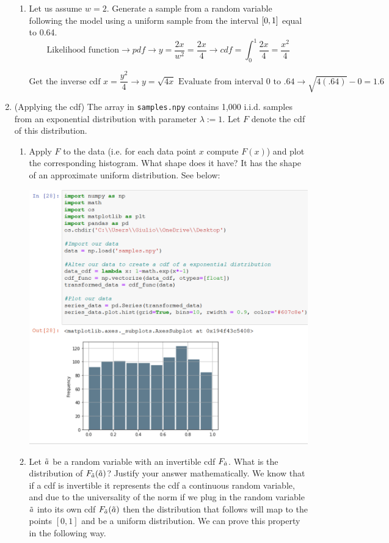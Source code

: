 \documentclass[12pt,twoside]{article}
\begin{document}
\begin{enumerate}
\begin{enumerate}
\item Let us assume $w=2$. Generate a sample from a random variable following the model using a uniform sample from the interval $\left[ 0,1 \right]$ equal to 0.64. 
\subitem 
$$
    \text{Likelihood function} \rightarrow pdf \rightarrow y = \frac{2x}{w^2} = \frac{2x}{4} \rightarrow cdf = \int_{0}^1 \frac{2x}{4} = \frac{x^2}{4}
$$

$$
    \text{Get the inverse cdf } x = \frac{y^2}{4} \rightarrow y=\sqrt{4x} \text{ Evaluate from interval 0 to .64} \rightarrow \sqrt{4(.64)} -0 = 1.6
$$
\end{enumerate}

\item (Applying the cdf) The array in \texttt{samples.npy} contains 1,000 i.i.d. samples from an exponential distribution with parameter $\lambda:=1$. Let $F$ denote the cdf of this distribution. 

\begin{enumerate}
\item Apply $F$ to the data (i.e. for each data point $x$ compute $F(x)$) and plot the corresponding histogram. What shape does it have?
\subitem 
It has the shape of an approximate uniform distribution. See below:

\includegraphics[scale=.5]{hw3graph2.png}
\item Let $\tilde{ a }$ be a random variable with an invertible cdf $F_{\tilde{ a }}$. What is the distribution of $F_{\tilde{ a }}(\tilde{ a })$? Justify your answer mathematically.
\subitem
We know that if a cdf is invertible it represents the cdf a continuous random variable, and due to the universality of the norm if we plug in the random variable $\tilde{ a }$ into its own cdf $F_{\tilde{ a }}(\tilde{ a })$ then the distribution that follows will map to the points $[0,1]$ and be a uniform distribution. We can prove this property in the following way. \\


\end{enumerate}
\end{enumerate}
\end{document}
